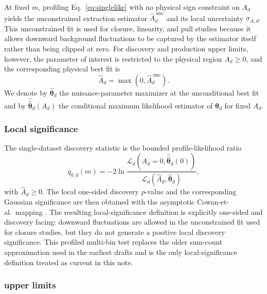 At fixed $m$, profiling Eq.~\eqref{eq:singlelike} with no physical sign constraint on
$A_d$ yields the unconstrained extraction estimator $\hat A_d^{\,\mathrm{unc}}$ and
its local uncertainty $\sigma_{A,d}$. This unconstrained fit is used for closure,
linearity, and pull studies because it allows downward background fluctuations to be
captured by the estimator itself rather than being clipped at zero. For discovery and
production upper limits, however, the parameter of interest is restricted to the
physical region $A_d\ge0$, and the corresponding physical best fit is
\begin{equation}
\hat A_d = \max\!\left(0,\hat A_d^{\,\mathrm{unc}}\right).
\end{equation}
We denote by $\hat{\bm{\theta}}_d$ the nuisance-parameter maximizer at the
unconditional best fit and by $\hat{\hat{\bm{\theta}}}_d(A_d)$ the conditional maximum
likelihood estimator of $\bm{\theta}_d$ for fixed $A_d$.

\subsubsection{Local significance}

The single-dataset discovery statistic is the bounded profile-likelihood ratio
\begin{equation}
q_{0,d}(m) = -2\ln
\frac{\mathcal{L}_d\!\left(A_d=0,\hat{\hat{\bm{\theta}}}_d(0)\right)}
{\mathcal{L}_d\!\left(\hat A_d,\hat{\bm{\theta}}_d\right)},
\label{eq:q0-single}
\end{equation}
with $\hat A_d\ge0$. The local one-sided discovery $p$-value and the corresponding
Gaussian significance are then obtained with the asymptotic Cowan-et-al.\ mapping
\cite{Cowan2011}. The resulting local-significance definition is explicitly
one-sided and discovery facing: downward fluctuations are allowed in the unconstrained
fit used for closure studies, but they do not generate a positive local discovery
significance. This profiled multi-bin test replaces the older sum-count approximation
used in the earliest drafts and is the only local-significance definition treated as
current in this note.

\subsubsection{\texorpdfstring{\CLs}{CLs} upper limits}

